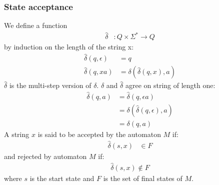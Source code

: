\documentclass[a4paper]{article}
\begin{document}
\subsubsection{State acceptance}
We define a function
\begin{align*}
    \hat{\delta}&: Q\times\Sigma^*\rightarrow Q
\end{align*}
by induction on the length of the string x:
\begin{align*}
    \hat{\delta}(q,\epsilon)&=q\\
    \hat{\delta}(q,xa)&=\delta(\hat{\delta}(q,x),a)
\end{align*}
$\hat{\delta}$ is the multi-step version of $\delta$. $\delta$ and $\hat{\delta}$
agree on string of length one:
\begin{align*}
    \hat{\delta}(q,a)&= \hat{\delta}(q, \epsilon a)\\
    &=\delta(\hat{\delta}(q,\epsilon),a)\\
    &=\delta(q,a)
\end{align*}
A string $x$ is said to be accepted by the automaton $M$ if:
\begin{align*}
    \hat{\delta}(s,x)&\in F
\end{align*}
and rejected by automaton $M$ if:
\begin{align*}
    \hat{\delta}(s,x)\notin F
\end{align*}
where $s$ is the start state and $F$ is the set of final states of $M$.
\end{document}
